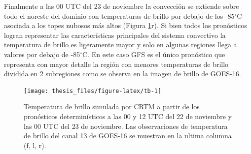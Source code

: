 \documentclass[12pt,oneside,a4paper]{reedthesis}
\begin{document}
Finalmente a las 00 UTC del 23 de noviembre la convección se extiende sobre todo el noreste del dominio con temperaturas de brillo por debajo de los -85\(^\circ\)C asociada a los topes nubosos más altos (Figura \ref{fig:tb}r). Si bien todos los pronósticos logran representar las características principales del sistema convectivo la temperatura de brillo es ligeramente mayor y solo en algunas regiones llega a valores por debajo de -85\(^\circ\)C. En este caso GFS es el único pronóstico que representa con mayor detalle la región con menores temperaturas de brillo dividida en 2 subregiones como se observa en la imagen de brillo de GOES-16.


\begin{figure}

\texttt{[image: thesis\_files/figure-latex/tb-1]} \hfill{}

\caption{Temperatura de brillo simulada por CRTM a partir de los pronósticos determinísticos a las 00 y 12 UTC del 22 de noviembre y las 00 UTC del 23 de noviembre. Las observaciones de temperatura de brillo del canal 13 de GOES-16 se muestran en la ultima columna (f, l, r).}\label{fig:tb}
\end{figure}
\end{document}
